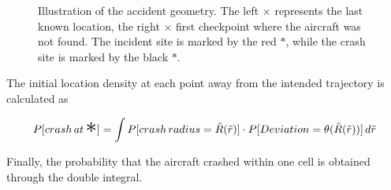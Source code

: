\documentclass[12pt, letterpaper]{article}  %
\theoremstyle{definition}
\theoremstyle{remark}
\theoremstyle{plain}
\begin{document}


\begin{center}
	\begin{figure}[H]
		\centering
		\caption{Illustration of the accident geometry. The left {\large $\times$} represents the last known location, the right {\large $\times$} first checkpoint where the aircraft was not found. The incident site is marked by the red {\huge $\ast$}, while the crash site is marked by the black {\huge $\ast$}.}
		\label{fig:CrashRadius}
	\end{figure}
\end{center}

The initial location density at each point away from the intended trajectory is calculated as

\[P[crash\,at\,\text{\huge $\ast$}] = \int P[crash\,radius=\tilde{R}(\tilde{r})]\cdot P[Deviation=\theta(\tilde{R}(\tilde{r}))]\,d\tilde{r}\]

Finally, the probability that the aircraft crashed within one cell is obtained through the double integral.



\end{document}
